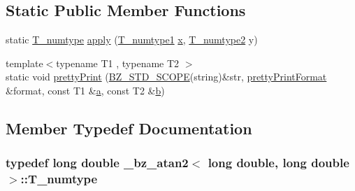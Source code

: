 \subsection*{Static Public Member Functions}
\begin{DoxyCompactItemize}
\item 
static \hyperlink{class__bz__atan2_3_01long_01double_00_01long_01double_01_4_a39d913da62e06bf5bbef59526946b6b9}{T\+\_\+numtype} \hyperlink{class__bz__atan2_3_01long_01double_00_01long_01double_01_4_a5e7d513d322182a574d1c359f1ba2843}{apply} (\hyperlink{class__bz__atan2_3_01long_01double_00_01long_01double_01_4_a98c5566fcb4e27378871c8f5ac69df5c}{T\+\_\+numtype1} \hyperlink{vecnorm1_8cc_ac73eed9e41ec09d58f112f06c2d6cb63}{x}, \hyperlink{class__bz__atan2_3_01long_01double_00_01long_01double_01_4_a53d0362ba4e3c73b02bec603b4957b37}{T\+\_\+numtype2} y)
\item 
{\footnotesize template$<$typename T1 , typename T2 $>$ }\\static void \hyperlink{class__bz__atan2_3_01long_01double_00_01long_01double_01_4_a3da3a52a39ec88400ddf6dbb230345ec}{pretty\+Print} (\hyperlink{numinquire_8h_a2b24ffc3b4ef9803956bc7715c6c7b83}{B\+Z\+\_\+\+S\+T\+D\+\_\+\+S\+C\+O\+P\+E}(string)\&str, \hyperlink{classprettyPrintFormat}{pretty\+Print\+Format} \&format, const T1 \&\hyperlink{gen__mat5files_8m_aae328bf20413f220e38aec4d95bfd6da}{a}, const T2 \&\hyperlink{gen__mat5files_8m_a7b38767b3b6a8dae167e5afa4fc340b0}{b})
\end{DoxyCompactItemize}


\subsection{Member Typedef Documentation}
\hypertarget{class__bz__atan2_3_01long_01double_00_01long_01double_01_4_a39d913da62e06bf5bbef59526946b6b9}{}
\subsubsection[{T\+\_\+numtype}]{\setlength{\rightskip}{0pt plus 5cm}typedef long double {\bf \+\_\+bz\+\_\+atan2}$<$ long double, long double $>$\+::{\bf T\+\_\+numtype}}\label{class__bz__atan2_3_01long_01double_00_01long_01double_01_4_a39d913da62e06bf5bbef59526946b6b9}
\hypertarget{class__bz__atan2_3_01long_01double_00_01long_01double_01_4_a98c5566fcb4e27378871c8f5ac69df5c}{}
